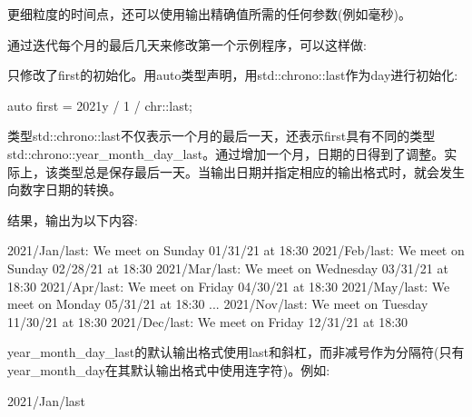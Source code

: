 更细粒度的时间点，还可以使用输出精确值所需的任何参数(例如毫秒)。


通过迭代每个月的最后几天来修改第一个示例程序，可以这样做:



只修改了first的初始化。用auto类型声明，用std::chrono::last作为day进行初始化:

\begin{cpp}
auto first = 2021y / 1 / chr::last;
\end{cpp}

类型std::chrono::last不仅表示一个月的最后一天，还表示first具有不同的类型std::chrono::year\_month\_day\_last。通过增加一个月，日期的日得到了调整。实际上，该类型总是保存最后一天。当输出日期并指定相应的输出格式时，就会发生向数字日期的转换。

结果，输出为以下内容:

\begin{shell}
2021/Jan/last:
 We meet on Sunday 01/31/21 at 18:30
2021/Feb/last:
 We meet on Sunday 02/28/21 at 18:30
2021/Mar/last:
 We meet on Wednesday 03/31/21 at 18:30
2021/Apr/last:
 We meet on Friday 04/30/21 at 18:30
2021/May/last:
 We meet on Monday 05/31/21 at 18:30
...
2021/Nov/last:
 We meet on Tuesday 11/30/21 at 18:30
2021/Dec/last:
 We meet on Friday 12/31/21 at 18:30
\end{shell}

year\_month\_day\_last的默认输出格式使用last和斜杠，而非减号作为分隔符(只有year\_month\_day在其默认输出格式中使用连字符)。例如:

\begin{shell}
2021/Jan/last
\end{shell}

